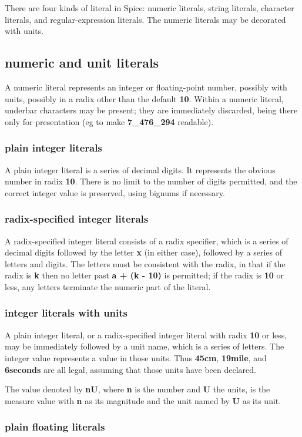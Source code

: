 \documentclass{report}
\begin{document}
There are four kinds of literal in Spice: numeric literals, string literals,
character literals, and regular-expression literals. The
numeric literals may be decorated with units.

\subsection{numeric and unit literals}


A numeric literal represents an integer or floating-point number, possibly
with units, possibly in a radix other than the default {\bf 10}. Within a numeric
literal, underbar characters may be present; they are immediately discarded,
being there only for presentation (eg to make {\bf 7\_476\_294} readable).

\subsubsection{plain integer literals}


A plain integer literal is a series of decimal digits. It represents the
obvious number in radix {\bf 10}. There is no limit to the number of digits
permitted, and the correct integer value is preserved, using bignums if
necessary.\subsubsection{radix-specified integer literals}


A radix-specified integer literal consists of a radix specifier, which is a
series of decimal digits followed by the letter {\bf x} (in either case), followed
by a series of letters and digits. The letters must be consistent with the
radix, in that if the radix is {\bf k} then no letter past {\bf a + (k - 10)} is
permitted; if the radix is {\bf 10} or less, any letters terminate the numeric
part of the literal.\subsubsection{integer literals with units}


A plain integer literal, or a radix-specified integer literal with radix {\bf 10}
or less, may be immediately followed by a unit name, which is a series of
letters. The integer value represents a value in those units. Thus {\bf 45cm},
{\bf 19mile}, and {\bf 6seconds} are all legal, assuming that those units have been
declared.

The value denoted by {\bf nU}, where {\bf n} is the number and {\bf U} the units, is the
measure value with {\bf n} as its magnitude and the unit named by {\bf U} as its unit.\subsubsection{plain floating literals}
\end{document}
